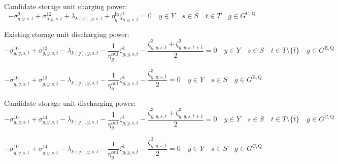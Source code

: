 \documentclass{article}
\newcommand{\sStorageExisting}{G^{\mathrm{E,Q}}}
\newcommand{\sStorageCandidate}{G^{\mathrm{C,Q}}}
\newcommand{\sYears}{Y}
\newcommand{\sScenarios}{S}
\newcommand{\sIntervals}{T}
\newcommand{\iGenerator}{g}
\newcommand{\iYear}{y}
\newcommand{\iScenario}{s}
\newcommand{\iInterval}{t}
\newcommand{\iIntervalTerminal}{\overline{\iInterval}}
\newcommand{\iZone}{z}
\newcommand{\cStorageUnitEfficiencyCharging}{\eta_{\iGenerator}^{\mathrm{in}}}
\newcommand{\cStorageUnitEfficiencyDischarging}{\eta_{\iGenerator}^{\mathrm{out}}}
\newcommand{\dNonNegativeCharging}[1][\iGenerator,\iYear,\iScenario,\iInterval]{\sigma_{#1}^{9}}
\newcommand{\dNonNegativeDischarging}[1][\iGenerator,\iYear,\iScenario,\iInterval]{\sigma_{#1}^{10}}
\newcommand{\dMaxChargingRateCandidate}[1][\iGenerator,\iYear,\iScenario,\iInterval]{\sigma_{#1}^{12}}
\newcommand{\dMaxDischargingRateExisting}[1][\iGenerator,\iYear,\iScenario,\iInterval]{\sigma_{#1}^{13}}
\newcommand{\dMaxDischargingRateCandidate}[1][\iGenerator,\iYear,\iScenario,\iInterval]{\sigma_{#1}^{14}}
\newcommand{\dPowerBalance}[1][\iZone,\iYear,\iScenario,\iInterval]{\lambda_{#1}}
\newcommand{\dStorageEnergyTransition}[1][\iGenerator,\iYear,\iScenario,\iInterval]{\zeta_{#1}^{1}}
\newcommand{\dStorageEnergyOutput}[1][\iGenerator,\iYear,\iScenario,\iInterval]{\zeta_{#1}^{3}}
\begin{document}
Candidate storage unit charging power:
\begin{equation}
- \dNonNegativeCharging + \dMaxChargingRateCandidate + \dPowerBalance[k(\iGenerator),\iYear,\iScenario,\iInterval] + \cStorageUnitEfficiencyCharging\dStorageEnergyTransition = 0 \quad \iYear \in \sYears \quad \iScenario \in \sScenarios \quad \iInterval \in \sIntervals \quad \iGenerator \in \sStorageCandidate
\end{equation}

Existing storage unit discharging power:
\begin{equation}
- \dNonNegativeDischarging + \dMaxDischargingRateExisting - \dPowerBalance[k(\iGenerator),\iYear,\iScenario,\iInterval] - \frac{1}{\cStorageUnitEfficiencyDischarging} \dStorageEnergyTransition - \frac{\dStorageEnergyOutput + \dStorageEnergyOutput[\iGenerator,\iYear,\iScenario,\iInterval+1]}{2} = 0 \quad \iYear \in \sYears \quad \iScenario \in \sScenarios \quad \iInterval \in \sIntervals \setminus \{\iIntervalTerminal\} \quad \iGenerator \in \sStorageExisting
\end{equation}

\begin{equation}
- \dNonNegativeDischarging[\iGenerator,\iYear,\iScenario,\iIntervalTerminal] + \dMaxDischargingRateExisting[\iGenerator,\iYear,\iScenario,\iIntervalTerminal] - \dPowerBalance[k(\iGenerator),\iYear,\iScenario,\iIntervalTerminal] - \frac{1}{\cStorageUnitEfficiencyDischarging} \dStorageEnergyTransition[\iGenerator,\iYear,\iScenario,\iIntervalTerminal] - \frac{\dStorageEnergyOutput[\iGenerator,\iYear,\iScenario,\iIntervalTerminal]}{2} = 0 \quad \iYear \in \sYears \quad \iScenario \in \sScenarios \quad \iGenerator \in \sStorageExisting
\end{equation}

Candidate storage unit discharging power:
\begin{equation}
- \dNonNegativeDischarging + \dMaxDischargingRateCandidate - \dPowerBalance[k(\iGenerator),\iYear,\iScenario,\iInterval] - \frac{1}{\cStorageUnitEfficiencyDischarging} \dStorageEnergyTransition - \frac{\dStorageEnergyOutput + \dStorageEnergyOutput[\iGenerator,\iYear,\iScenario,\iInterval+1]}{2} = 0 \quad \iYear \in \sYears \quad \iScenario \in \sScenarios \quad \iInterval \in \sIntervals \setminus \{\iIntervalTerminal\} \quad \iGenerator \in \sStorageCandidate
\end{equation}

\begin{equation}
- \dNonNegativeDischarging[\iGenerator,\iYear,\iScenario,\iIntervalTerminal] + \dMaxDischargingRateCandidate[\iGenerator,\iYear,\iScenario,\iIntervalTerminal] - \dPowerBalance[k(\iGenerator),\iYear,\iScenario,\iIntervalTerminal] - \frac{1}{\cStorageUnitEfficiencyDischarging} \dStorageEnergyTransition[\iGenerator,\iYear,\iScenario,\iIntervalTerminal] - \frac{\dStorageEnergyOutput[\iGenerator,\iYear,\iScenario,\iIntervalTerminal]}{2} = 0 \quad \iYear \in \sYears \quad \iScenario \in \sScenarios \quad \iGenerator \in \sStorageCandidate
\end{equation}
\end{document}
